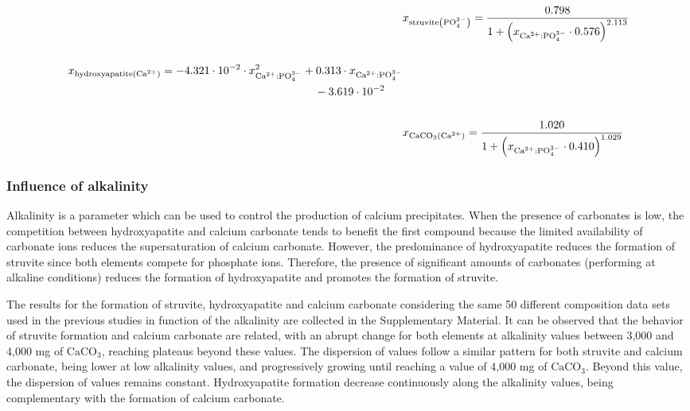 \documentclass[10pt,a4paper]{article}
\begin{document}
\begin{align}
&x_{\text{struvite} \left(\text{PO}_{4}^{3-}\right) }= \frac{0.798}{1+\left(x_{\text{Ca}^{2+}:\text{PO}_{4}^{3-}} \cdot 0.576\right)^{2.113}} \label{eq:sigmoidal_Ca_StrYield} \\
\nonumber \\
\begin{split}
& x_{\text{hydroxyapatite} \left(\text{Ca}^{2+}\right)} = -4.321 \cdot 10^{-2} \cdot x_{\text{Ca}^{2+}:\text{PO}_{4}^{3-}}^{2} + 0.313 \cdot x_{\text{Ca}^{2+}:\text{PO}_{4}^{3-}} \\& \hspace{7.8cm} - 3.619 \cdot 10^{-2} \label{eq:sigmoidal_Ca_HAP}
\end{split}
\\
\nonumber \\
&  x_{\text{CaCO}_{3} \left(\text{Ca}^{2+}\right)} = \frac{1.020}{1+\left(x_{\text{Ca}^{2+}:\text{PO}_{4}^{3-}} \cdot 0.410 \right)^{1.029}} \label{eq:sigmoidal_CaCaCO3}
\end{align}

\subsubsection{Influence of alkalinity}
Alkalinity is a parameter which can be used to control the production of calcium precipitates. When the presence of carbonates is low, the competition between hydroxyapatite and calcium carbonate tends to benefit the first compound because the limited availability of carbonate ions reduces the supersaturation of calcium carbonate. However, the predominance of hydroxyapatite reduces the formation of struvite since both elements compete for phosphate ions. Therefore, the presence of significant amounts of carbonates (performing at alkaline conditions) reduces the formation of hydroxyapatite and promotes the formation of struvite. 

The results for the formation of struvite, hydroxyapatite and calcium carbonate considering the same 50 different composition data sets used in the previous studies  in function of the alkalinity are collected in the Supplementary Material.
It can be observed that the behavior of struvite formation and calcium carbonate are related, with an abrupt change for both elements at alkalinity values between 3,000 and 4,000 mg of $\text{CaCO}_{3}$, reaching plateaus beyond these values. The dispersion of values follow a similar pattern for both struvite and calcium carbonate, being lower at low alkalinity values, and progressively growing until reaching a value of 4,000 mg of $\text{CaCO}_{3}$. Beyond this value, the dispersion of  values remains constant. Hydroxyapatite formation decrease continuously along the alkalinity values, being complementary with the formation of calcium carbonate.
\end{document}

